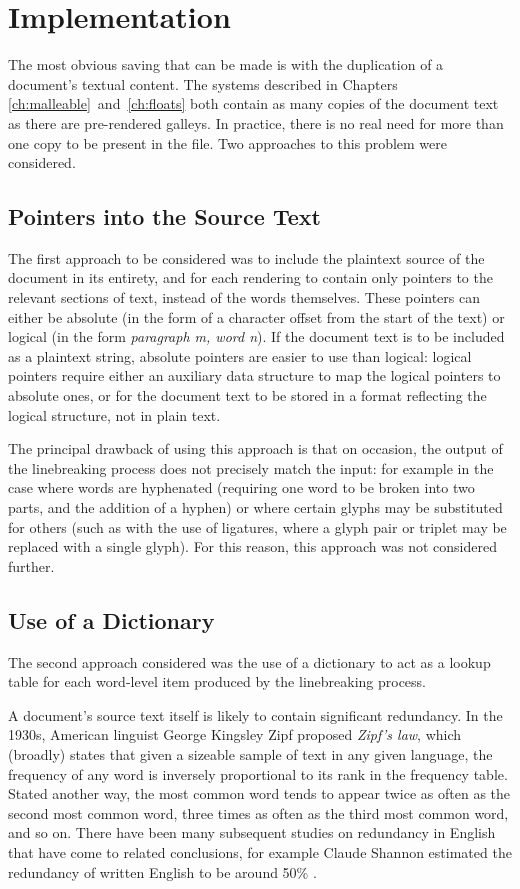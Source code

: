 \newpage
\section{Implementation}
The most obvious saving that can be made is with the duplication of a document's textual content. The systems described in Chapters \ref{ch:malleable}~and~\ref{ch:floats} both contain as many copies of the document text as there are pre-rendered \glspl{galley}. In practice, there is no real need for more than one copy to be present in the file. Two approaches to this problem were considered.

\subsection{Pointers into the Source Text}
The first approach to be considered was to include the plaintext source of the document in its entirety, and for each rendering to contain only pointers to the relevant sections of text, instead of the words themselves. These pointers can either be absolute (in the form of a character offset from the start of the text) or logical (in the form \emph{paragraph m, word n}). If the document text is to be included as a plaintext string, absolute pointers are easier to use than logical: logical pointers require either an auxiliary data structure to map the logical pointers to absolute ones, or for the document text to be stored in a format reflecting the logical structure, \ie{} not in plain text.

The principal drawback of using this approach is that on occasion, the output of the linebreaking process does not precisely match the input: for example in the case where words are hyphenated (requiring one word to be broken into two parts, and the addition of a hyphen) or where certain \glspl{glyph} may be substituted for others (such as with the use of ligatures, where a \gls{glyph} pair or triplet may be replaced with a single \gls{glyph}). For this reason, this approach was not considered further.


\subsection{Use of a Dictionary}
\label{sec:dictionary}
The second approach considered was the use of a dictionary to act as a lookup table for each word-level item produced by the linebreaking process.

A document's source text itself is likely to contain significant redundancy. In the 1930s, American linguist George Kingsley Zipf proposed \emph{Zipf's law},\hspace{0pt}\cite{zipf1932} which (broadly) states that given a sizeable sample of text in any given language, the frequency of any word is inversely proportional to its rank in the frequency table. Stated another way, the most common word tends to appear twice as often as the second most common word, three times as often as the third most common word, and so on. There have been many subsequent studies on redundancy in English that have come to related conclusions, for example Claude Shannon estimated the redundancy of written English to be around 50\% \cite{Shannon1951, Hirst1988}.

